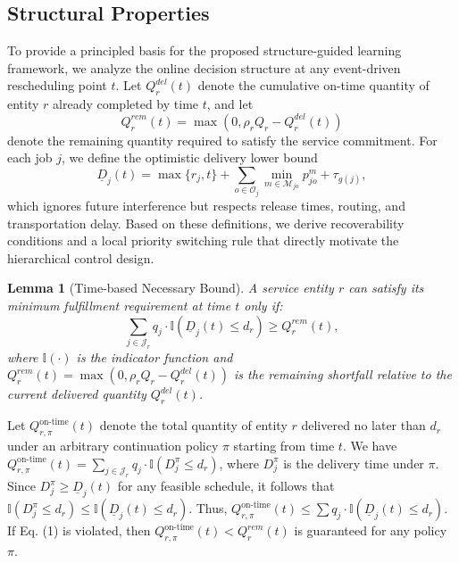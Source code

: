 \documentclass[a4paper,fleqn]{cas-sc}
\newtheorem{lemma}[theorem]{Lemma}
\begin{document}
\subsection{Structural Properties}
\label{sec:structural_properties}

To provide a principled basis for the proposed structure-guided learning framework, we analyze the online decision structure at any event-driven rescheduling point $t$. Let $Q_r^{del}(t)$ denote the cumulative on-time quantity of entity $r$ already completed by time $t$, and let
\begin{equation}
Q_r^{rem}(t)=\max(0,\rho_r Q_r-Q_r^{del}(t))
\end{equation}
denote the remaining quantity required to satisfy the service commitment. For each job $j$, we define the optimistic delivery lower bound
\begin{equation}
\underline{D}_j(t)=\max\{r_j,t\}+\sum_{o\in\mathcal{O}_j}\min_{m\in\mathcal{M}_{jo}} p_{jo}^m+\tau_{g(j)},
\end{equation}
which ignores future interference but respects release times, routing, and transportation delay. Based on these definitions, we derive recoverability conditions and a local priority switching rule that directly motivate the hierarchical control design.

\begin{lemma}[Time-based Necessary Bound]
\label{lemma:time_bound}
A service entity $r$ can satisfy its minimum fulfillment requirement at time $t$ only if:
\begin{equation}
\sum_{j \in \mathcal{J}_r} q_j \cdot \mathbb{I}(\underline{D}_j(t) \le d_r) \ge Q_r^{rem}(t),
\end{equation}
where $\mathbb{I}(\cdot)$ is the indicator function and $Q_r^{rem}(t) = \max(0, \rho_r Q_r - Q_r^{del}(t))$ is the remaining shortfall relative to the current delivered quantity $Q_r^{del}(t)$.
\end{lemma}

\begin{pf}
Let $Q_{r,\pi}^{\text{on-time}}(t)$ denote the total quantity of entity $r$ delivered no later than $d_r$ under an arbitrary continuation policy $\pi$ starting from time $t$. We have $Q_{r,\pi}^{\text{on-time}}(t) = \sum_{j \in \mathcal{J}_r} q_j \cdot \mathbb{I}(D_j^\pi \le d_r)$, where $D_j^\pi$ is the delivery time under $\pi$. Since $D_j^\pi \ge \underline{D}_j(t)$ for any feasible schedule, it follows that $\mathbb{I}(D_j^\pi \le d_r) \le \mathbb{I}(\underline{D}_j(t) \le d_r)$. Thus, $Q_{r,\pi}^{\text{on-time}}(t) \le \sum q_j \cdot \mathbb{I}(\underline{D}_j(t) \le d_r)$. If Eq. (1) is violated, then $Q_{r,\pi}^{\text{on-time}}(t) < Q_r^{rem}(t)$ is guaranteed for any policy $\pi$.
\end{pf}
\end{document}
